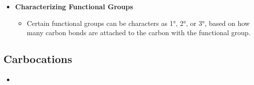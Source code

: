 \documentclass[12pt,a4paper]{article}
\begin{document}
\begin{itemize}
\begin{itemize}
\begin{itemize}
                    \begin{itemize}
                        \item {}\hspace{12pt}
                    \end{itemize}
            \end{itemize}
        \item \textbf{Characterizing Functional Groups}
            \begin{itemize}
                \item Certain functional groups can be characters as \ang{1}, \ang{2}, or \ang{3}, based on how many carbon bonds are attached to the carbon with the functional group.
            \end{itemize}
    \end{itemize}
\end{itemize}


\subsection{Carbocations}
\begin{itemize}
    \item 
\end{itemize}
\end{document}
